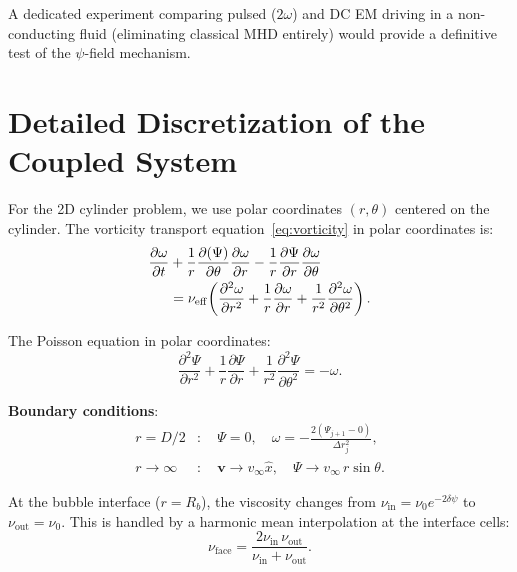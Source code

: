 \documentclass[12pt,twocolumn]{article}
\newcommand{\Reff}{\mathrm{eff}}
\newcommand{\vvec}{\mathbf{v}}
\newcommand{\dpsi}{\delta\psi}
\begin{document}
A dedicated experiment comparing pulsed ($2\omega$) and DC EM driving
in a non-conducting fluid (eliminating classical MHD entirely) would
provide a definitive test of the $\psi$-field mechanism.

\appendix

\section{Detailed Discretization of the Coupled System}
\label{app:discretization}

For the 2D cylinder problem, we use polar coordinates $(r,\theta)$ centered
on the cylinder. The vorticity transport equation~\eqref{eq:vorticity} in
polar coordinates is:
\begin{align}
\frac{\partial\omega}{\partial t}
&+ \frac{1}{r}\frac{\partial(\Psi)}{\partial\theta}
\frac{\partial\omega}{\partial r}
- \frac{1}{r}\frac{\partial\Psi}{\partial r}
\frac{\partial\omega}{\partial\theta} \notag\\
&= \nu_\Reff\!\left(\frac{\partial^2\omega}{\partial r^2}
+ \frac{1}{r}\frac{\partial\omega}{\partial r}
+ \frac{1}{r^2}\frac{\partial^2\omega}{\partial\theta^2}\right).
\label{eq:vort_polar}
\end{align}

The Poisson equation in polar coordinates:
\begin{equation}
\frac{\partial^2\Psi}{\partial r^2}
+ \frac{1}{r}\frac{\partial\Psi}{\partial r}
+ \frac{1}{r^2}\frac{\partial^2\Psi}{\partial\theta^2}
= -\omega.
\label{eq:poisson_polar}
\end{equation}

\textbf{Boundary conditions}:
\begin{align}
r = D/2&:\quad \Psi = 0,\quad
\omega = -\frac{2(\Psi_{j+1} - 0)}{\Delta r_j^2}, \\
r \to \infty&:\quad \vvec \to v_\infty\hat{x},\quad
\Psi \to v_\infty\,r\sin\theta.
\end{align}

At the bubble interface ($r = R_b$), the viscosity changes from
$\nu_\mathrm{in} = \nu_0 e^{-2\dpsi}$ to $\nu_\mathrm{out} = \nu_0$.
This is handled by a harmonic mean interpolation at the interface cells:
\begin{equation}
\nu_\mathrm{face} = \frac{2\nu_\mathrm{in}\,\nu_\mathrm{out}}
{\nu_\mathrm{in} + \nu_\mathrm{out}}.
\end{equation}
\end{document}
